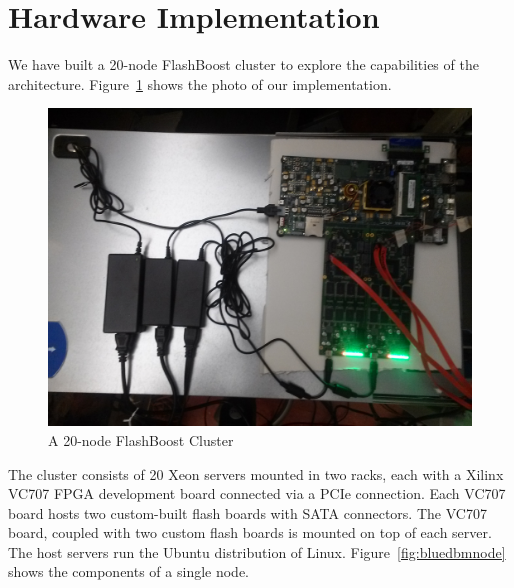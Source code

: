 \section{Hardware Implementation}

We have built a 20-node FlashBoost cluster to explore the capabilities of the
architecture. Figure~\ref{fig:bluedbmcluster} shows the photo of our
implementation.

\begin{figure}[ht]
	\begin{center}
	\includegraphics[width=0.3\paperwidth]{figures/rackserver.jpg}
	\caption{A 20-node FlashBoost Cluster}
	\label{fig:bluedbmcluster}
	\end{center}
\end{figure}

The cluster consists of 20 Xeon servers mounted in two racks, each with a Xilinx
VC707 FPGA development board connected via a PCIe connection. Each VC707 board
hosts two custom-built flash boards with SATA connectors. The VC707 board,
coupled with two custom flash boards is mounted on top of each server.
The host servers run the Ubuntu distribution of Linux.
Figure~\ref{fig:bluedbmnode} shows the components of a single node.

